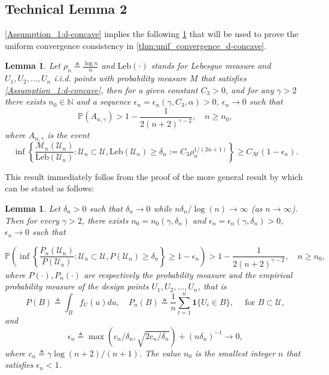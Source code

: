 \documentclass{article} %
\newtheorem{lemma}[theorem]{Lemma}
\begin{document}
\newpage

\subsection{Technical Lemma 2}\label{app:tecnical_lemma_2}

\cref{Assumption_1:d-concave} implies the following \cref{lemma:A_n} that will be used to prove the uniform convergence consistency in \cref{thm:unif_convergence_d-concave}.

\begin{lemma}\label{lemma:A_n}
Let $\rho_n\triangleq \frac{\log n}{n}$ and $\text{Leb}(\cdot)$ stands for Lebesgue measure and $U_1,U_2,\dots,U_n$ i.i.d. points with probability measure $M$ that satisfies \cref{Assumption_1:d-concave}, then for a given constant $C_3>0$, and for any $\gamma >2$ there exists $n_0 \in \mathbb{N}$ and a sequence $\epsilon_n = \epsilon_n(\gamma,C_3,\alpha)>0$, $\epsilon_n \rightarrow 0$ such that
$$
\mathbb{P}\left(A_{n,\gamma}\right) > 1-\frac{1}{2(n+2)^{\gamma -2}}, \quad n \geq n_0,
$$
where $A_{n,\gamma}$ is the event
$$
  \inf\left\{\frac{\mathscr{M}_n\left(\mathcal{U}_n\right)}{\text{Leb}\left(\mathcal{U}_n\right)}:\mathcal{U}_n \subset \mathcal{U}, \text{Leb}\left(\mathcal{U}_n\right) \geq \delta_n:=C_3 \rho_n^{1 /(2\alpha+1)} \right\}\geq C_{\mathscr{M}}(1-\epsilon_n).
$$
\end{lemma}

This result immediately follos from the proof of the more general result by \citet[Section 4.3]{mosching2020monotone} which can be stated as follows:
\begin{lemma}\label{lemma:dumbgen_asymptotics_points}
Let $\delta_n>0$ such that $\delta_n \rightarrow 0$ while $n\delta_n /\log(n) \rightarrow \infty$ (as $n\rightarrow \infty$). Then for every $\gamma>2$, there exists $n_0 = n_0 (\gamma, \delta_n)$ and $\epsilon_n = \epsilon_n(\gamma,\delta_n)>0$, $\epsilon_n \rightarrow 0$ such that 

$$  \mathbb{P}\left(\inf\left\{\frac{P_n\left(\mathcal{U}_n\right)}{P\left(\mathcal{U}_n\right)}:\mathcal{U}_n \subset \mathcal{U}, P\left(\mathcal{U}_n\right) \geq \delta_n \right\}\geq 1-\epsilon_n\right) > 1-\frac{1}{2(n+2)^{\gamma -2}}, \quad n \geq n_0,
$$
where $P(\cdot),P_n(\cdot)$ are respectively the probability measure and the empirical probability measure of the design points $U_1,U
_2,\dots,U_n$, that is
$$
P(B)\triangleq\int_B f_U(u)du, \quad P_n(B)\triangleq \frac{1}{n}\sum_{t=1}^n \mathbf{1}\{U_i \in B\},\quad \text { for } B \subset \mathcal{U}, 
$$
and
$$
\epsilon_n\triangleq\max \left(c_n / \delta_n, \sqrt{2 c_n / \delta_n}\right)+\left(n \delta_n\right)^{-1} \rightarrow 0,
$$
where $c_n\triangleq \gamma \log (n+2) /(n+1)$. The value $n_0$ is the smallest integer $n$ that satisfies $\epsilon_n<1$.
\end{lemma}
\end{document}
